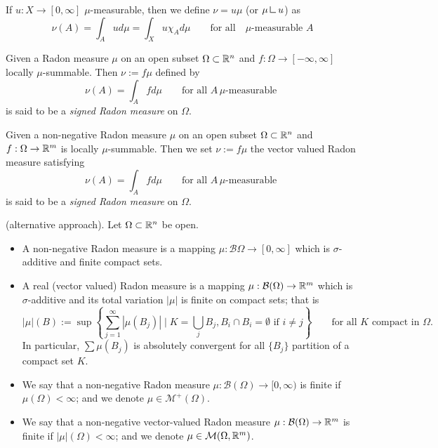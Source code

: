 \begin{definition}
If $u : X \to [0,\infty]$ $\mu$-measurable, then we define $\nu = u \mu$ (or
$\mu \res u$) as 
\[
\nu(A) = \int_A u d\mu = \int_X u \chi_A d\mu 
\qquad \text{for all} \quad  \mu\text{-measurable } A
\]
\end{definition}

\begin{definition}
Given a Radon measure $\mu$ on an open subset $\Omega \subset \mathbb{R}^n$ and $f: \Omega \to
[-\infty,\infty]$ locally $\mu$-summable. Then $\nu := f \mu$ defined by
\[
\nu(A) = \int_A f d\mu 
\qquad \text{for all }  A \, \mu\text{-measurable }
\]
is said to be a \emph{signed Radon measure} on $\Omega$.
\end{definition}

\begin{definition}
Given a non-negative Radon measure $\mu$ on an open subset $\Omega \subset \mathbb{R}^n$ and $f: \Omega \to
\mathbb{R}^m$ is locally $\mu$-summable. Then we set $\nu := f \mu$ the vector valued
Radon measure satisfying
\[
\nu(A) = \int_A f d\mu 
\qquad \text{for all }  A \, \mu\text{-measurable }
\]
is said to be a \emph{signed Radon measure} on $\Omega$.
\end{definition}

\begin{definition}(alternative approach). Let $\Omega \subset \mathbb{R}^n$ be open.
\begin{itemize}
\item A non-negative Radon measure is a mapping $\mu : \mathcal{B}{\Omega} \to
[0,\infty]$ which is $\sigma$-additive and finite compact sets.
\item A real (vector valued) Radon measure is a mapping $\mu :
\mathcal{B}(\Omega) \to \mathbb{R}^m$ which is $\sigma$-additive and its total variation
$|\mu|$ is finite on compact sets; that is
\[
|\mu|(B) := \sup \left\{
\sum_{j=1}^\infty |\mu(B_j)| \mid K = \bigcup_{j} B_j, B_i \cap B_i = \emptyset
\text{ if } i\neq j
\right\}
\qquad \text{for all $K$ compact in $\Omega$}.
\]
In particular, $\sum \mu(B_j)$ is absolutely convergent for all $\{B_j\}$
partition of a compact set $K$.
\item We say that a non-negative Radon measure $\mu : \mathcal{B}(\Omega) \to
[0,\infty)$ is finite if $\mu(\Omega) < \infty$; and we denote $\mu \in
\mathcal{M}^+(\Omega)$.
\item We say that a non-negative vector-valued Radon measure $\mu : \mathcal{B}(\Omega) \to
\mathbb{R}^m$ is finite if $|\mu|(\Omega) < \infty$; and we denote $\mu \in
\mathcal{M}(\Omega,\mathbb{R}^m)$.
\end{itemize}
\end{definition}

